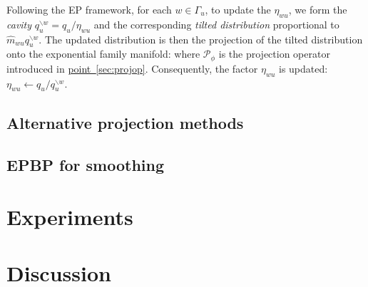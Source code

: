 Following the EP framework, for each $w\in\Gamma_u$, to update the $\eta_{wu}$, we form the \emph{cavity} $q^{\backslash w}_{u}=q_{u}/\eta_{wu}$ and the corresponding \emph{tilted distribution} proportional to $\widehat m_{wu} q_{u}^{\backslash w}$.  The updated distribution is then the projection of the tilted distribution onto the exponential family manifold:
where $\mathcal P_{\phi}$ is the projection operator introduced in \hyperref[sec:projop]{point~\ref*{sec:projop}}. Consequently, the factor $\eta_{wu}$ is updated: $\eta_{wu} \leftarrow  q_{u}/ q_{u}^{\backslash w}$.

\subsection{Alternative projection methods}

\subsection{EPBP for smoothing}

\section{Experiments}

\section{Discussion}

